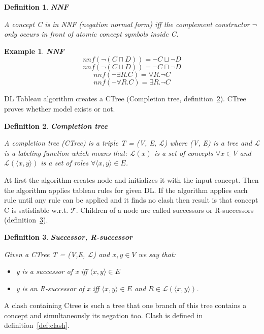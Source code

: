\documentclass[12pt,a4paper]{article}
\newtheorem{definition}{Definition}[subsection]
\newtheorem{example}{Example}[subsection]
\begin{document}
\begin{definition}{\textbf{NNF}}
	\label{def:nnf}
	
	A concept C is in NNF (negation normal form) iff the complement constructor $\neg$ 
	only occurs in front of atomic concept symbols inside C.
\end{definition}

\begin{example}{\textbf{NNF}}
	\[ nnf(\neg (C \sqcap D)) = \neg C \sqcup \neg D \]
	\[ nnf(\neg (C \sqcup D)) = \neg C \sqcap \neg D \]
	\[ nnf(\neg \exists R.C) = \forall R. \neg C \]
	\[ nnf(\neg \forall R.C) = \exists R. \neg C \]
\end{example}

DL Tableau algorithm creates a CTree (Completion tree, definition~\ref{def:ctree}). CTree proves whether model exists or not.

\begin{definition}{\textbf{Completion tree}}
	\label{def:ctree}

	A completion tree (CTree) is a triple T = (V, E, $\mathcal{L}$) where (V, E)
	is a tree and $\mathcal{L}$ is a labeling function which means that:
	$\mathcal{L}(x)$ is a set of concepts $\forall x \in V$ and
	$\mathcal{L}(\langle x, y \rangle )$ is a set of roles $\forall \langle x, y \rangle \in E$.	
\end{definition}

At first the algorithm creates node and initializes it with the input concept.
Then the algorithm applies tableau rules for given DL. If the algorithm applies each rule until any rule can be applied and it finds no clash then result is that concept C is satisfiable w.r.t. $\mathcal{T}$. Children of a node are called successors or R-successors (definition~\ref{def:successor}).

\begin{definition}{\textbf{Successor, R-successor}}
	\label{def:successor}

	Given a CTree T = (V,E, $\mathcal{L}$) and $x,y \in V$ we say that: 
	\begin{itemize}
		\item y is a successor of x iff $\langle x,y \rangle \in E$
		\item y is an R-successor of x iff $\langle x,y \rangle \in E$ and $R \in \mathcal{L}(\langle x,y \rangle)$.
	\end{itemize}
\end{definition}

A clash containing Ctree is such a tree that one branch of this tree contains a concept and simultaneously its negation too. Clash is defined in definition~\ref{def:clash}.
\end{document}
